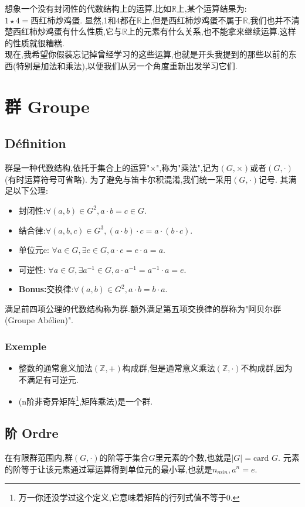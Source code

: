 \documentclass[12pt, a4paper, oneside]{ctexbook}
\begin{document}
  想象一个没有封闭性的代数结构上的运算,比如$\mathbb{R}$上,某个运算结果为:$1\star 4=\text{西红柿炒鸡蛋}$.
  显然,1和4都在$\mathbb{R}$上,但是西红柿炒鸡蛋不属于$\mathbb{R}$,我们也并不清楚西红柿炒鸡蛋有什么性质,它与$\mathbb{R}$上的元素有什么关系,也不能拿来继续运算.这样的性质就很糟糕.\\
  
  现在,我希望你假装忘记掉曾经学习的这些运算,也就是开头我提到的那些以前的东西(特别是加法和乘法),以便我们从另一个角度重新出发学习它们.

\section{群 Groupe}
  \subsection{Définition}
  群是一种代数结构,依托于集合上的运算"$\times$",称为"乘法",记为$(G,\times)$或者$(G,\cdot)$(有时运算符号可省略).
  为了避免与笛卡尔积混淆,我们统一采用$(G,\cdot)$记号.
  其满足以下公理:
  \begin{itemize}
    \item 封闭性:$\forall(a,b)\in G^2,a\cdot b=c\in G $.
    \item 结合律:$\forall(a,b,c)\in G^3,(a\cdot b)\cdot c=a\cdot (b\cdot c) $.
    \item 单位元e: $\forall a\in G, \exists e\in G, a\cdot e=e\cdot a=a$.
    \item 可逆性:  $\forall a\in G, \exists a^{-1}\in G, a\cdot a^{-1}=a^{-1}\cdot a=e$.
    \item \textbf{Bonus:}交换律:$\forall(a,b)\in G^2,a\cdot b=b\cdot a $.
  \end{itemize}
  满足前四项公理的代数结构称为群.额外满足第五项交换律的群称为"阿贝尔群(Groupe Abélien)".
  \subsubsection{Exemple}
  \begin{itemize}
    \item 整数的通常意义加法$(\mathbb{Z},+) $构成群,但是通常意义乘法$(\mathbb{Z},\cdot) $不构成群,因为不满足有可逆元.
    \item (n阶非奇异矩阵\footnote{万一你还没学过这个定义,它意味着矩阵的行列式值不等于0.},矩阵乘法)是一个群.



  \end{itemize}
  \subsection{阶 Ordre}
  在有限群范围内,群$(G,\cdot)$的阶等于集合$G$里元素的个数,也就是$|G|=\text{card }G$.
  元素的阶等于让该元素通过幂运算得到单位元的最小幂,也就是$n_{min},a^n=e$.
\end{document}
